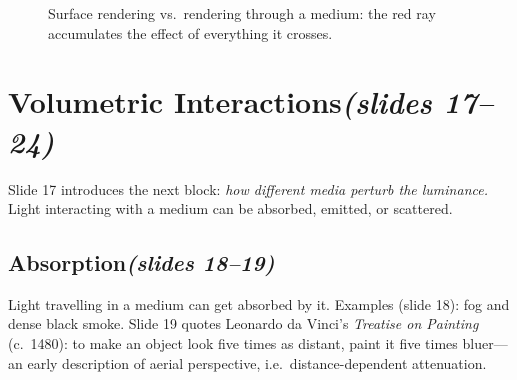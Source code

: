 \documentclass[11pt,a4paper]{article}
\newcommand{\slides}[1]{\texorpdfstring{\hfill{\normalfont\small\emph{(slides #1)}}}{ (slides #1)}}
\theoremstyle{remark}\newtheorem*{remark}{Remark}
\begin{document}
\begin{figure}[h]
\centering
{}
\caption{Surface rendering vs.\ rendering through a medium: the red ray accumulates the effect of everything it crosses.}
\end{figure}

\section{Volumetric Interactions\slides{17--24}}
Slide 17 introduces the next block: \emph{how different media perturb the luminance.} Light interacting with a medium can be absorbed, emitted, or scattered.

\subsection{Absorption\slides{18--19}}

Light travelling in a medium can get absorbed by it. Examples (slide 18): fog and dense black smoke. Slide 19 quotes Leonardo da Vinci's \emph{Treatise on Painting} (c.~1480): to make an object look five times as distant, paint it five times bluer---an early description of aerial perspective, i.e.\ distance-dependent attenuation.
\end{document}
